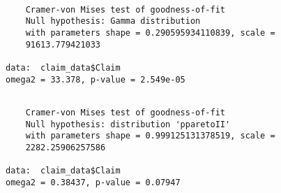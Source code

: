 \documentclass[]{book}
\newenvironment{Shaded}{\begin{snugshade}}{\end{snugshade}}
\newcommand{\KeywordTok}[1]{\textcolor[rgb]{0.13,0.29,0.53}{\textbf{#1}}}
\newcommand{\DataTypeTok}[1]{\textcolor[rgb]{0.13,0.29,0.53}{#1}}
\newcommand{\DecValTok}[1]{\textcolor[rgb]{0.00,0.00,0.81}{#1}}
\newcommand{\StringTok}[1]{\textcolor[rgb]{0.31,0.60,0.02}{#1}}
\newcommand{\CommentTok}[1]{\textcolor[rgb]{0.56,0.35,0.01}{\textit{#1}}}
\newcommand{\OperatorTok}[1]{\textcolor[rgb]{0.81,0.36,0.00}{\textbf{#1}}}
\newcommand{\NormalTok}[1]{#1}
\theoremstyle{definition}
\theoremstyle{definition}
\theoremstyle{definition}
\theoremstyle{remark}
\begin{document}
\begin{Shaded}
\end{Shaded}

\begin{verbatim}

    Cramer-von Mises test of goodness-of-fit
    Null hypothesis: Gamma distribution
    with parameters shape = 0.290595934110839, scale =
    91613.779421033

data:  claim_data$Claim
omega2 = 33.378, p-value = 2.549e-05
\end{verbatim}

\begin{Shaded}
\end{Shaded}

\begin{verbatim}

    Cramer-von Mises test of goodness-of-fit
    Null hypothesis: distribution 'pparetoII'
    with parameters shape = 0.999125131378519, scale =
    2282.25906257586

data:  claim_data$Claim
omega2 = 0.38437, p-value = 0.07947
\end{verbatim}

\begin{Shaded}
\end{Shaded}
\end{document}
